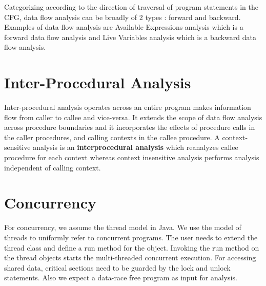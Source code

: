 Categorizing according to the direction of traversal of program statements in the CFG, data flow analysis can be broadly of 2 types : forward and backward. Examples of
data-flow analysis are Available Expressions analysis which is a forward data flow analysis
and Live Variables analysis which is a backward data flow analysis. \\

\section{Inter-Procedural Analysis}

Inter-procedural analysis operates across an entire program makes information flow from caller to callee and vice-versa. It extends the scope of data flow analysis across procedure boundaries and it incorporates the effects of procedure calls in the caller procedures, and calling contexts in the callee procedure. A context-sensitive analysis is an \textbf{interprocedural analysis} which reanalyzes callee procedure for each context whereas context insensitive analysis performs analysis independent of calling context.





\section{Concurrency}

For concurrency, we assume the thread model in Java. We use the model of threads to uniformly refer to concurrent programs. The user needs to extend the thread class and define a run method for the object. Invoking the run method on the thread objects starts the multi-threaded concurrent execution. For accessing shared data, critical sections need to be guarded by the lock and unlock statements. Also we expect a data-race free program as input for analysis.


%

